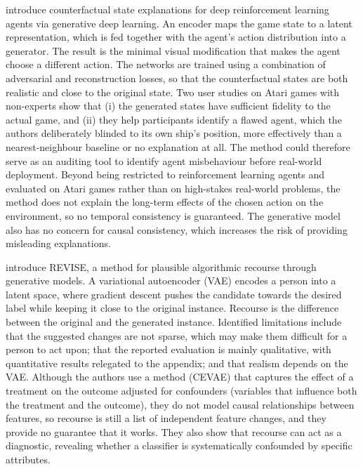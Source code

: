 \citet{Olson_2021} introduce counterfactual state explanations for deep reinforcement learning agents via
generative deep learning. An encoder maps the game state to a latent representation, which is fed
together with the agent's action distribution into a generator. The result is the minimal visual
modification that makes the agent choose a different action. The networks are trained using a
combination of adversarial and reconstruction losses, so that the counterfactual states are both
realistic and close to the original state. Two user studies on Atari games with non-experts show that
(i) the generated states have sufficient fidelity to the actual game, and (ii) they help participants
identify a flawed agent, which the authors deliberately blinded to its own ship's position, more
effectively than a nearest-neighbour baseline or no explanation at all. The method could therefore serve
as an auditing tool to identify agent misbehaviour before real-world deployment. Beyond being restricted
to reinforcement learning agents and evaluated on Atari games rather than on high-stakes real-world
problems, the method does not explain the long-term effects of the chosen action on the environment, so
no temporal consistency is guaranteed. The generative model also has no concern for causal consistency,
which increases the risk of providing misleading explanations.

\citet{joshi2019towards} introduce REVISE, a method for plausible algorithmic recourse through generative
models. A variational autoencoder (VAE) encodes a person into a latent space, where gradient descent
pushes the candidate towards the desired label while keeping it close to the original instance. Recourse
is the difference between the original and the generated instance. Identified limitations include that
the suggested changes are not sparse, which may make them difficult for a person to act upon; that the
reported evaluation is mainly qualitative, with quantitative results relegated to the appendix; and that
realism depends on the VAE. Although the authors use a method (CEVAE) that captures the effect of a
treatment on the outcome adjusted for confounders (variables that influence both the treatment and the
outcome), they do not model causal relationships between features, so recourse is still a list of
independent feature changes, and they provide no guarantee that it works. They also show that recourse
can act as a diagnostic, revealing whether a classifier is systematically confounded by specific
attributes.

